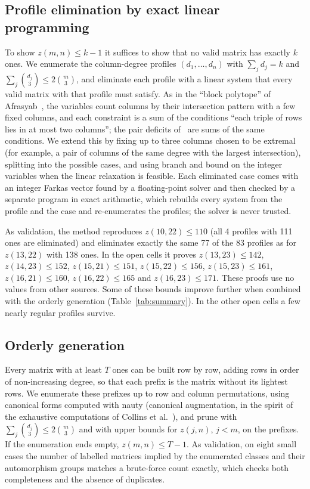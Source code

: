 \documentclass[11pt]{article}
\begin{document}
\subsection{Profile elimination by exact linear programming}

To show $z(m,n)\le k-1$ it suffices to show that no valid matrix has
exactly $k$ ones. We enumerate the column-degree profiles
$(d_1,\dots,d_n)$ with $\sum_j d_j=k$ and
$\sum_j\binom{d_j}{3}\le2\binom{m}{3}$, and eliminate each profile with a
linear system that every valid matrix with that profile must satisfy. As in
the ``block polytope'' of Afrasyab~\cite[Section~3]{Afr26}, the variables
count columns by their intersection pattern with a few fixed columns, and
each constraint is a sum of the conditions ``each triple of rows lies in at
most two columns''; the pair deficits of~\cite{Fie26} are sums of the same
conditions. We extend this by fixing up to three columns chosen to be
extremal (for example, a pair of columns of the same degree with the largest
intersection), splitting into the possible cases, and using branch and
bound on the integer variables when the linear relaxation is feasible.
Each eliminated case comes with an integer Farkas vector found by a
floating-point solver and then checked by a separate program in exact
arithmetic, which rebuilds every system from the profile and the case and
re-enumerates the profiles; the solver is never trusted.

As validation, the method reproduces $z(10,22)\le110$ \cite{Fie26} (all 4
profiles with 111 ones are eliminated) and eliminates exactly the same 77
of the 83 profiles as \cite{Afr26} for $z(13,22)$ with 138 ones. In the
open cells it proves $z(13,23)\le142$, $z(14,23)\le152$, $z(15,21)\le151$,
$z(15,22)\le156$, $z(15,23)\le161$, $z(16,21)\le160$, $z(16,22)\le165$ and
$z(16,23)\le171$. These proofs use no values from other sources. Some of
these bounds improve further when combined with the orderly generation
(Table~\ref{tab:summary}). In the other open cells a few nearly regular
profiles survive.

\subsection{Orderly generation}

Every matrix with at least $T$ ones can be built row by row, adding rows in
order of non-increasing degree, so that each prefix is the matrix without
its lightest rows. We enumerate these prefixes up to row and column
permutations, using canonical forms computed with nauty (canonical
augmentation, in the spirit of the exhaustive computations of Collins et
al.~\cite{CRWR16}), and prune with $\sum_j\binom{d_j}{3}\le2\binom{m}{3}$
and with upper bounds for $z(j,n)$, $j<m$, on the prefixes. If the
enumeration ends empty, $z(m,n)\le T-1$. As validation, on eight small
cases the number of labelled matrices implied by the enumerated classes and
their automorphism groups matches a brute-force count exactly, which checks
both completeness and the absence of duplicates.
\end{document}
